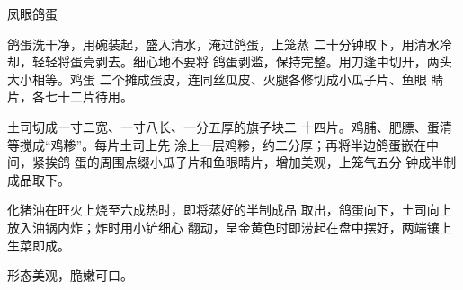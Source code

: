 \begin{recipe}{凤眼鸽蛋}

\ingredients


\cooking

\step 鸽蛋洗干净，用碗装起，盛入清水，淹过鸽蛋，上笼蒸 二十分钟取下，用清水冷却，轻轻将蛋壳剥去。细心地不要将 鸽蛋剥滥，保持完整。用刀逢中切开，两头大小相等。鸡蛋 二个摊成蛋皮，连同丝瓜皮、火腿各修切成小瓜子片、鱼眼 睛片，各七十二片待用。

\step 土司切成一寸二宽、一寸八长、一分五厚的旗子块二 十四片。鸡脯、肥膘、蛋清等搅成“鸡糁”。每片土司上先 涂上一层鸡糁，约二分厚；再将半边鸽蛋嵌在中间，紧挨鸽 蛋的周围点缀小瓜子片和鱼眼睛片，增加美观，上笼气五分 钟成半制成品取下。

\step 化猪油在旺火上烧至六成热时，即将蒸好的半制成品 取出，鸽蛋向下，土司向上放入油锅内炸；炸时用小铲细心 翻动，呈金黄色时即涝起在盘中摆好，两端镶上生菜即成。

\notes

形态美观，脆嫩可口。

\end{recipe}


